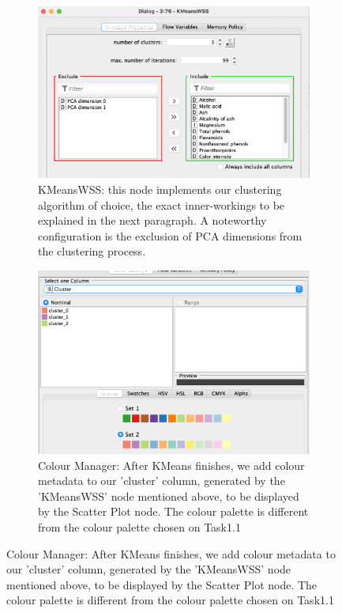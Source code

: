 \documentclass[11pt]{article}
\begin{document}
			\iftrue
			\begin{figure}[H]
				\centering
				\begin{subfigure}{0.4\textwidth}
					\includegraphics[width=\textwidth]{res/t1/t12/t12-kmeans-wss-conf}
					\caption{KMeansWSS: this node implements our clustering algorithm of choice, the exact inner-workings to be explained in the next paragraph. A noteworthy configuration is the exclusion of PCA dimensions from the clustering process.}
					\label{fig:first}
				\end{subfigure}
				\hfill
				\begin{subfigure}{0.4\textwidth}
					\includegraphics[width=\textwidth]{res/t1/t12/t12-color-manager-conf}
					\caption{Colour Manager: After KMeans finishes, we add colour metadata to our 'cluster' column, generated by the 'KMeansWSS' node mentioned above, to be displayed by the Scatter Plot node. The colour palette is different from the colour palette chosen on Task1.1}
					\label{fig:second}
				\end{subfigure}
				\hfill
			\end{figure}
\end{document}
